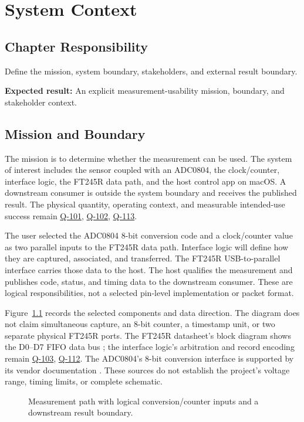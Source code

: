 \chapter{System Context}
\section{Chapter Responsibility}
\label{Section:SystemContextResponsibility}
Define the mission, system boundary, stakeholders, and external result boundary.

\noindent\textbf{Expected result:} An explicit measurement-usability mission, boundary, and stakeholder context.

\section{Mission and Boundary}
\label{Section:MeasurementMission}
The mission is to determine whether the measurement can be used. The system of interest includes the sensor coupled with an ADC0804, the clock/counter, interface logic, the FT245R data path, and the host control app on macOS. A downstream consumer is outside the system boundary and receives the published result. The physical quantity, operating context, and measurable intended-use success remain \hyperref[Question:Q-101]{Q-101}, \hyperref[Question:Q-102]{Q-102}, \hyperref[Question:Q-113]{Q-113}.

The user selected the ADC0804 8-bit conversion code and a clock/counter value as two parallel inputs to the FT245R data path. Interface logic will define how they are captured, associated, and transferred. The FT245R USB-to-parallel interface carries those data to the host. The host qualifies the measurement and publishes code, status, and timing data to the downstream consumer. These are logical responsibilities, not a selected pin-level implementation or packet format.

Figure~\ref{Figure:SensorContext} records the selected components and data direction. The diagram does not claim simultaneous capture, an 8-bit counter, a timestamp unit, or two separate physical FT245R ports. The FT245R datasheet's block diagram shows the D0--D7 FIFO data bus \cite{FT245RDatasheet}; the interface logic's arbitration and record encoding remain \hyperref[Question:Q-103]{Q-103}, \hyperref[Question:Q-112]{Q-112}. The ADC0804's 8-bit conversion interface is supported by its vendor documentation \cite{ADC0804Datasheet}. These sources do not establish the project's voltage range, timing limits, or complete schematic.
\begin{figure}[htbp]
\centering
\resizebox{\linewidth}{!}{}
\caption{Measurement path with logical conversion/counter inputs and a downstream result boundary.}
\label{Figure:SensorContext}
\end{figure}

